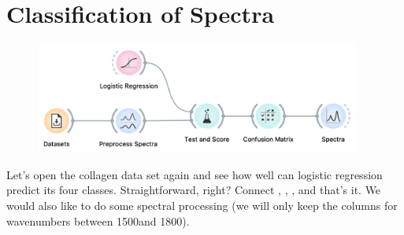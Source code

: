 \chapter{Classification of Spectra}
\label{ch:spectra_classification}

\begin{figure}
    \centering
    \vspace{-3.4cm}
    \includegraphics[width=0.95\textwidth]{graphics/ch-spectra_classification/sp_classification-fig1.png}
    \label{fig:spectra_classification-fig1}
\end{figure}


Let’s open the collagen data set again and see how well can logistic regression predict its four classes. Straightforward, right? Connect , , ,  and that's it. We would also like to do some spectral processing (we will only keep the columns for wavenumbers between 1500\wn and 1800\wn).

